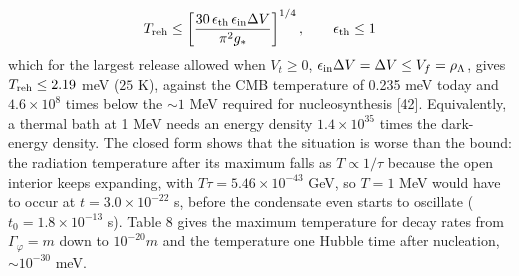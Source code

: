 \documentclass[11pt,a4paper]{article}
\begin{document}
\begin{equation}
T_{\rm reh}\le\left[\frac{30\,\epsilon_{\rm th}\,\epsilon_{\rm in}\Delta V}{\pi^2g_*}\right]^{1/4},\qquad \epsilon_{\rm th}\le1
\end{equation}
which for the largest release allowed when $V_t\ge0$, $\epsilon_{\rm in}\Delta V = \Delta V\le V_f=\rho_\Lambda$, gives $T_{\rm reh}\le 2.19$ meV ($25$ K), against the CMB temperature of 0.235 meV today and $4.6\times10^{8}$ times below the $\sim1$ MeV required for nucleosynthesis [42]. Equivalently, a thermal bath at 1 MeV needs an energy density $1.4\times10^{35}$ times the dark-energy density. The closed form shows that the situation is worse than the bound: the radiation temperature after its maximum falls as $T\propto1/\tau$ because the open interior keeps expanding, with $T\tau=5.46\times10^{-43}$ GeV, so $T=1$ MeV would have to occur at $t=3.0\times10^{-22}$ s, before the condensate even starts to oscillate ($t_0=1.8\times10^{-13}$ s). Table 8 gives the maximum temperature for decay rates from $\Gamma_\varphi=m$ down to $10^{-20}m$ and the temperature one Hubble time after nucleation, $\sim10^{-30}$ meV.
\end{document}
